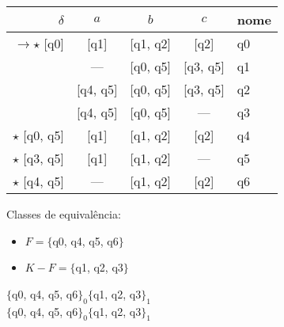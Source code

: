 \documentclass[answers]{exam}
\begin{document}
\begin{questions}
\begin{parts}
\begin{solution}
    \begin{tabular}{ r || c | c | c || l }
        $\delta$ & $a$ & $b$ & $c$ & nome \\ \hline\hline
        $\rightarrow\star$ [q0] & [q1] & [q1, q2] & [q2] & q0 \\
        \null [q1] & --- & [q0, q5] & [q3, q5] & q1 \\
        \null [q1, q2] & [q4, q5] & [q0, q5] & [q3, q5] & q2 \\
        \null [q2] & [q4, q5] & [q0, q5] & --- & q3 \\
        $\star$ [q0, q5] & [q1] & [q1, q2] & [q2] & q4 \\
        $\star$ [q3, q5] & [q1] & [q1, q2] & --- & q5 \\
        $\star$ [q4, q5] & --- & [q1, q2] & [q2] & q6 \\
    \end{tabular}\newline

    Classes de equivalência:

    \begin{itemize}
        \item $F = \{$q0, q4, q5, q6$\}$
        \item $K - F = \{$q1, q2, q3$\}$
    \end{itemize}


    $\{$q0, q4, q5, q6$\}_0\{$q1, q2, q3$\}_1$ \\
    $\{$q0, q4, q5, q6$\}_0\{$q1, q2, q3$\}_1$
\end{solution}

\end{parts}

\end{questions}
\end{document}
